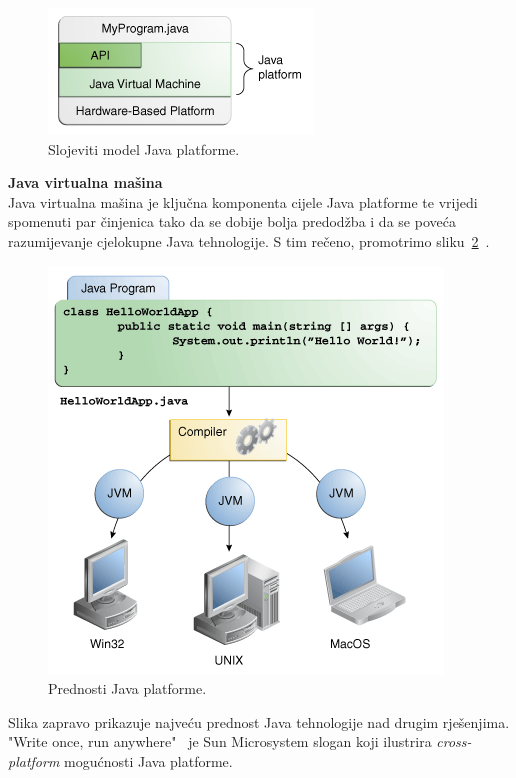 \begin{figure}[!htbp]
    \caption{Slojeviti model Java platforme.}
    \label{fig:java_platform_layer_model}
    \centering
    \includegraphics[scale=0.6]{images/java_platform_layer_model.png}
\end{figure}

\textbf{Java virtualna mašina}\\
Java virtualna mašina je ključna komponenta cijele Java platforme te vrijedi spomenuti par činjenica tako da se dobije bolja predodžba i da se poveća razumijevanje cjelokupne Java tehnologije. S tim rečeno, promotrimo sliku~\ref{fig:java_platform_benefits}~\cite{javatutorials}.

\begin{figure}[!htbp]
    \caption{Prednosti Java platforme.}
    \label{fig:java_platform_benefits}
    \centering
    \includegraphics[scale=0.6]{images/java_platform_benefits.png}
\end{figure}

Slika zapravo prikazuje najveću prednost Java tehnologije nad drugim rješenjima. "Write once, run anywhere"~\cite{writeoncerunanywhere} je Sun Microsystem slogan koji ilustrira \emph{cross-platform} mogućnosti Java platforme.

